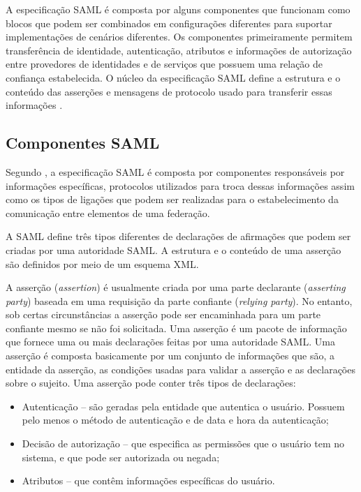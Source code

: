 A especificação SAML é composta por alguns componentes que funcionam como blocos que podem ser combinados em configurações diferentes para suportar implementações de cenários diferentes. Os componentes primeiramente permitem transferência de identidade, autenticação, atributos e informações de autorização entre provedores de identidades e de serviços que possuem uma relação de confiança estabelecida. O núcleo da especificação SAML define a estrutura e o conteúdo das asserções e mensagens de protocolo usado para transferir essas informações \cite{oasis:08}.

\subsection{Componentes SAML}
\label{ss_c2_comp_saml}

Segundo \cite{oasis:08}, a especificação SAML é composta por componentes responsáveis por informações específicas, protocolos utilizados para troca dessas informações assim como os tipos de ligações que podem ser realizadas para o estabelecimento da comunicação entre elementos de uma federação.

A SAML define três tipos diferentes de declarações de afirmações que podem ser criadas por uma autoridade SAML. A estrutura e o conteúdo de uma asserção são definidos por meio de um esquema XML.

A asserção (\textit{assertion}) é usualmente criada por uma parte declarante (\textit{asserting party}) baseada em uma requisição da parte confiante (\textit{relying party}). No entanto, sob certas circunstâncias a asserção pode ser encaminhada para um parte confiante mesmo se não foi solicitada. Uma asserção é um pacote de informação que fornece uma ou mais declarações feitas por uma autoridade SAML. Uma asserção é composta basicamente por um conjunto de informações que são, a entidade da asserção, as condições usadas para validar a asserção e as declarações sobre o sujeito. Uma asserção pode conter três tipos de declarações:

\begin{itemize}
 \item Autenticação -- são geradas pela entidade que autentica o usuário. Possuem pelo menos o método de autenticação e de data e hora da autenticação;
 \item Decisão de autorização -- que especifica as permissões que o usuário tem no sistema, e que pode ser autorizada ou negada;
 \item Atributos -- que contêm informações específicas do usuário.
\end{itemize}

